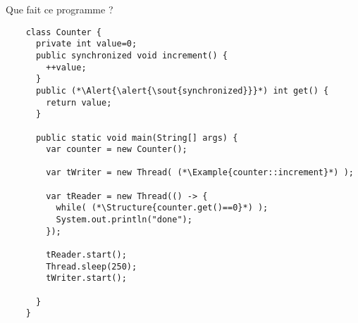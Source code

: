 
\begingroup

\begin{frame}[fragile]{Que fait ce programme ?}

  \begin{lstlisting}
    class Counter {
      private int value=0;
      public synchronized void increment() {
        ++value;
      }
      public (*\Alert{\alert{\sout{synchronized}}}*) int get() {
        return value;
      }

      public static void main(String[] args) {
        var counter = new Counter();
        
        var tWriter = new Thread( (*\Example{counter::increment}*) );

        var tReader = new Thread(() -> {
          while( (*\Structure{counter.get()==0}*) );
          System.out.println("done");
        });
        
        tReader.start();
        Thread.sleep(250);
        tWriter.start();
        
      }
    }
  \end{lstlisting}


\end{frame}

\endgroup
\endinput
